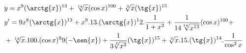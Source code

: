\begin{ex}
\begin{align}
&y=x^9(\arctg{x})^{13}+\sqrt[14]{x}(\cos{x})^{100}+\sqrt[3]{x}(\tg{x})^{15}\nonumber\\
&y'=9x^8(\arctg{x})^{13}+x^9.13.(\arctg{x})^12.\frac{1}{1+x^2}+\frac{1}{14\sqrt[14]{x^{13}}}(\cos{x})^{100}+\nonumber\\
&+\sqrt[14]{x}.100.(\cos{x})^99(-\sen{x})+\frac{1}{3\sqrt[3]{x^2}}(\tg{x})^{15}+\sqrt[3]{x}.15.(\tg{x})^{14}.\frac{1}{\cos^2{x}}\nonumber
\end{align}
\end{ex}